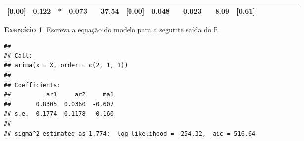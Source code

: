 \documentclass[
]{book}
\theoremstyle{definition}
\theoremstyle{definition}
\theoremstyle{definition}
\newtheorem{exercise}{Exercício}[chapter]
\theoremstyle{remark}
\begin{document}
\begin{longtable}[]{@{}lllllllllllllllllll@{}}
\begin{minipage}[t]{0.05\columnwidth}
{[}0.00{]}\strut
\end{minipage} & \begin{minipage}[t]{0.04\columnwidth}\raggedright
0.122\strut
\end{minipage} & \begin{minipage}[t]{0.02\columnwidth}\raggedright
*\strut
\end{minipage} & \begin{minipage}[t]{0.03\columnwidth}\raggedright
0.073\strut
\end{minipage} & \begin{minipage}[t]{0.02\columnwidth}\raggedright
\strut
\end{minipage} & \begin{minipage}[t]{0.03\columnwidth}\raggedright
37.54\strut
\end{minipage} & \begin{minipage}[t]{0.05\columnwidth}\raggedright
{[}0.00{]}\strut
\end{minipage} & \begin{minipage}[t]{0.02\columnwidth}\raggedright
0.048\strut
\end{minipage} & \begin{minipage}[t]{0.01\columnwidth}\raggedright
\strut
\end{minipage} & \begin{minipage}[t]{0.03\columnwidth}\raggedright
0.023\strut
\end{minipage} & \begin{minipage}[t]{0.01\columnwidth}\raggedright
\strut
\end{minipage} & \begin{minipage}[t]{0.03\columnwidth}\raggedright
8.09\strut
\end{minipage} & \begin{minipage}[t]{0.05\columnwidth}\raggedright
{[}0.61{]}\strut
\end{minipage}\tabularnewline
\bottomrule
\end{longtable}

\begin{exercise}
\protect\hypertarget{exr:exersr}{}{\label{exr:exersr} }Escreva a equação do modelo para a seguinte saída do R
\end{exercise}

\begin{verbatim}
## 
## Call:
## arima(x = X, order = c(2, 1, 1))
## 
## Coefficients:
##          ar1     ar2     ma1
##       0.8305  0.0360  -0.607
## s.e.  0.1774  0.1178   0.160
## 
## sigma^2 estimated as 1.774:  log likelihood = -254.32,  aic = 516.64
\end{verbatim}
\end{document}
